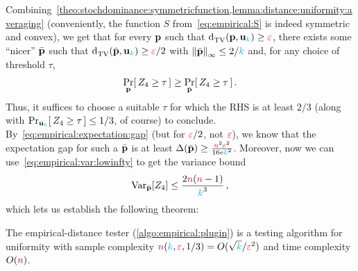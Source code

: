 Combining~\cref{theo:stochdominance:symmetricfunction,lemma:distance:uniformity:averaging} (conveniently, the function $S$ from~\cref{eq:empirical:S} is indeed symmetric and convex), we get that for every $\mathbf{p}$ such that $\totalvardist{\p}{\uniform_\ab} \geq \dst$, there exists some ``nicer'' $\bar{\mathbf{p}}$ such that $\totalvardist{\bar{\p}}{\uniform_\ab} \geq \dst/2$ with $\norminf{\bar{\p}}\leq 2/\ab$ and, for any choice of threshold $\tau$,
\begin{equation}
    \probaDistrOf{\p}{Z_4 \geq \tau } \geq \probaDistrOf{\bar{\p}}{Z_4 \geq \tau }\,.
\end{equation}
Thus, it suffices to choose a suitable $\tau$ for which the RHS is at least $2/3$ (along with $\probaDistrOf{\uniform_\ab}{Z_4 \geq \tau } \leq 1/3$, of course) to conclude. By~\cref{eq:empirical:expectation:gap} (but for $\textcolor{red}{\varepsilon}/2$, not $\textcolor{red}{\varepsilon}$), we know that the expectation gap for such a $\bar{\mathbf{p}}$ is at least
$\Delta(\bar{\mathbf{p}})\geq \frac{{\textcolor{purple}{n}}^2\textcolor{red}{\varepsilon}^2}{16e{\textcolor{cyan}{k}}^2}$. Moreover, now we can use~\cref{eq:empirical:var:lowinfty} to get the variance bound 
\begin{align}
  \operatorname{Var}_{\bar{\mathbf{p}}}[Z_4] 
   \leq \frac{2{\textcolor{purple}{n}}({\textcolor{purple}{n}}-1)}{{\textcolor{cyan}{k}}^3}\,,
\end{align}
which lets us establish the following theorem:
\begin{theorem}
The empirical-distance tester (\cref{algo:empirical:plugin}) is a testing algorithm for uniformity with sample complexity ${\textcolor{purple}{n}}({\textcolor{cyan}{k}},\textcolor{red}{\varepsilon},1/3) = O(\sqrt{{\textcolor{cyan}{k}}}/\textcolor{red}{\varepsilon}^2)$ and time complexity $O({\textcolor{purple}{n}})$.
\end{theorem}
